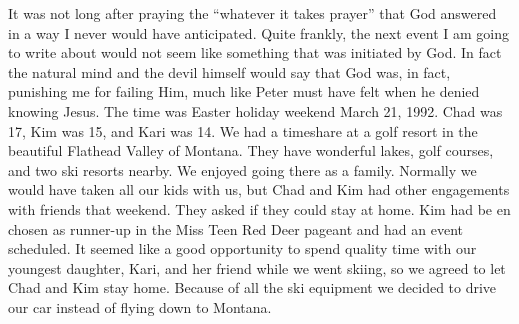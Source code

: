 \documentclass[oneside]{book}
\begin{document}
It was not long after praying the “whatever it takes prayer” that God answered in a way I never would have anticipated. Quite frankly, the next event I am going to write about would not seem like something that was initiated by God. In fact the natural mind and the devil himself would say that God was, in fact, punishing me for failing Him, much like Peter must have felt when he denied knowing Jesus. The time was Easter holiday weekend March 21, 1992. Chad was 17, Kim was 15, and Kari was 14. We had a timeshare at a golf resort in the beautiful Flathead Valley of Montana. They have wonderful lakes, golf courses, and two ski resorts nearby. We enjoyed going there as a family. Normally we would have taken all our kids with us, but Chad and Kim had other engagements with friends that weekend. They asked if they could stay at home. Kim had be
en chosen as runner-up in the Miss Teen Red Deer pageant and had an event scheduled. It seemed like a good opportunity to spend quality time with our youngest daughter, Kari, and her friend while we went skiing, so we agreed to let Chad and Kim stay home. Because of all the ski equipment we decided to drive our car instead of flying down to Montana. 
\end{document}
